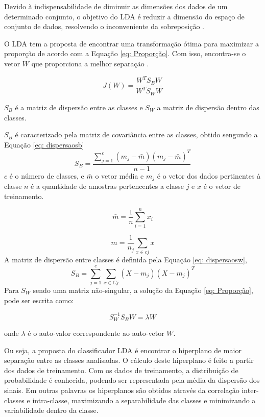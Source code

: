 Devido à indispensabilidade de diminuir as dimensões dos dados de um determinado conjunto, o objetivo do LDA
é reduzir a dimensão do espaço de conjunto de dados, resolvendo o inconveniente da sobreposição \cite{SinghLDA}.

O LDA tem a proposta de encontrar uma transformação ótima para maximizar a proporção de acordo com a Equação \ref{eq: Proporção}.
Com isso, encontra-se o vetor $W$ que proporciona a melhor separação \cite{ketsuwan2017linear}.

\begin{equation}
	\label{eq: Proporção}
	J(W) = \frac { W^T S_B W}{W^T S_W W}
\end{equation}

$S_B$ é a matriz de dispersão entre as classes e $ S_W$ a matriz de dispersão dentro das classes. 

$S_B$ é caracterizado pela matriz de covariância entre as classes, obtido sengundo a Equação \ref{eq: dispersaosb} 
\begin{equation}
	\label{eq: dispersaosb}
	 S_B = \frac{\sum_{j=1}^{c} (m_j - \bar m)(m_j -\bar m)^T}{n - 1} 
\end{equation}
$c$ é o número de classes, e $\bar m$ o vetor média e  $m_j$ é o vetor dos dados pertinentes à classe $n$ é a quantidade de amostras pertencentes a classe $j$ e $x$ é o vetor de treinamento.

\begin{equation}
	\label{eq: media}
	\bar m = \frac{1}{n}\sum_{i=1}^{n} {x_i}
\end{equation}

\begin{equation}
	\label{eq: media2}
	m = \frac{1}{n_j}\sum_{x \in c j}^{} x
\end{equation}
A matriz de dispersão entre classes é definida pela Equação \ref{eq: dispersaosw},
\begin{equation}
	\label{eq: dispersaosw}
	 S_B = \sum_{j=1}^{c} \sum_{x \in C j}{} (X - m_j)(X - m_j)^T 
\end{equation}
Para $S_W$ sendo uma matriz não-singular, a solução da Equação 
\ref{eq: Proporção}, pode ser escrita como: 

 \begin{equation}
	\label{eq: final}
	S_W^{-1} S_B W = \lambda W
\end{equation}
 
onde $\lambda$ é o auto-valor correspondente ao auto-vetor $W$.

Ou seja, a proposta do classificador LDA é encontrar o hiperplano de maior separação entre as classes analisadas. O cálculo deste hiperplano é feito a partir dos dados de treinamento. Com os dados de treinamento, a distribuição de probabilidade é conhecida, podendo ser representada pela média da dispersão dos sinais. Em outras palavras os hiperplanos são obtidos através da correlação inter-classes e intra-classe, maximizando a separabilidade das classes e minimizando a variabilidade dentro da classe. 


